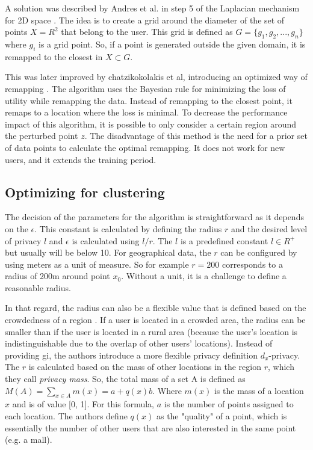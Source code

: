 A solution was described by Andres et al. in step 5 of the Laplacian mechanism for 2D space \citep{DBLP:journals/corr/abs-1212-1984}.
The idea is to create a grid around the diameter of the set of points $X = R^2$ that belong to the user.
This grid is defined as $G = \{g_1, g_2, ..., g_n\}$ where $g_i$ is a grid point.
So, if a point is generated outside the given domain, it is remapped to the closest in $X \subset G$.

This was later improved by chatzikokolakis et al, introducing an optimized way of remapping \citep{chatzikokolakis_efficient_2017}.
The algorithm uses the Bayesian rule for minimizing the loss of utility while remapping the data.
Instead of remapping to the closest point, it remaps to a location where the loss is minimal.
To decrease the performance impact of this algorithm, it is possible to only consider a certain region around the perturbed point $z$.
The disadvantage of this method is the need for a prior set of data points to calculate the optimal remapping.
It does not work for new users, and it extends the training period.

\subsection{Optimizing for clustering} \label{2d:optimizing}
The decision of the parameters for the algorithm is straightforward as it depends on the $\epsilon$. \label{paragraph:choosing-r}
This constant is calculated by defining the radius $r$ and the desired level of privacy $l$ and $\epsilon$ is calculated using $l/r$.
The $l$ is a predefined constant $l \in R^+$ but usually will be below 10.
For geographical data, the $r$ can be configured by using meters as a unit of measure.
So for example $r = 200$ corresponds to a radius of 200m around point $x_0$.
Without a unit, it is a challenge to define a reasonable radius.

In that regard, the radius can also be a flexible value that is defined based on the crowdedness of a region \citep{chatzikokolakis_constructing_2015}.
If a user is located in a crowded area, the radius can be smaller than if the user is located in a rural area (because the user's location is indistinguishable due to the overlap of other users' locations).
Instead of providing \gls{gi}, the authors introduce a more flexible privacy definition $d_x$-privacy.
The $r$ is calculated based on the mass of other locations in the region $r$, which they call \emph{privacy mass}.
So, the total mass of a set A is defined as $M(A) = \sum_{x \in A} m(x) = a + q(x)b$.
Where $m(x)$ is the mass of a location $x$ and is of value [0, 1].
For this formula, $a$ is the number of points assigned to each location.
The authors define $q(x)$ as the "quality" of a point, which is essentially the number of other users that are also interested in the same point (e.g. a mall).

